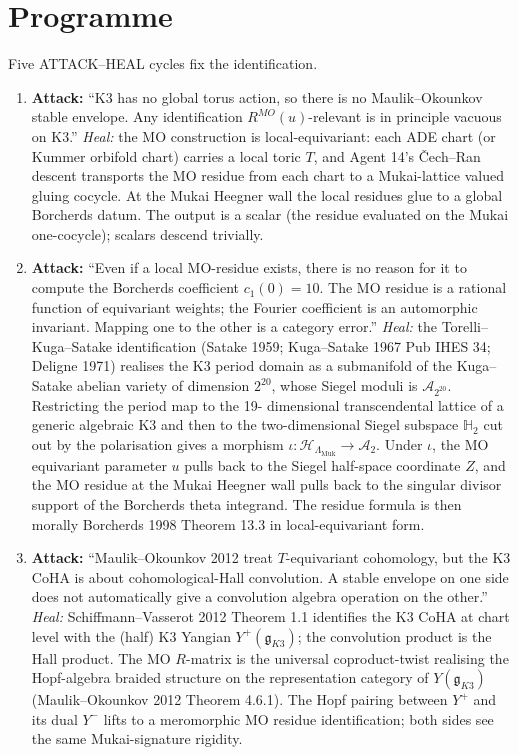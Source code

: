 \section*{Programme}

Five ATTACK--HEAL cycles fix the identification.

\begin{enumerate}
\item[(A1)]
   \textbf{Attack:} ``K3 has no global torus action, so there is no
   Maulik--Okounkov stable envelope.  Any identification
   $R^{MO}(u)$-relevant is in principle vacuous on K3.''
   \emph{Heal:} the MO construction is
   local-equivariant: each ADE chart (or Kummer orbifold chart)
   carries a local toric $T$, and Agent 14's \v Cech--Ran descent
   transports the MO residue from each chart to a Mukai-lattice
   valued gluing cocycle.  At the Mukai Heegner wall the local
   residues glue to a global Borcherds datum.  The output is a
   scalar (the residue evaluated on the Mukai one-cocycle); scalars
   descend trivially.

\item[(A2)]
   \textbf{Attack:} ``Even if a local MO-residue exists, there is no
   reason for it to compute the Borcherds coefficient $c_1(0) = 10$.
   The MO residue is a rational function of equivariant weights; the
   Fourier coefficient is an automorphic invariant.  Mapping one to
   the other is a category error.''
   \emph{Heal:} the Torelli--Kuga--Satake identification (Satake
   1959; Kuga--Satake 1967 Pub IHES 34; Deligne 1971) realises the
   K3 period domain as a submanifold of the Kuga--Satake abelian
   variety of dimension $2^{20}$, whose Siegel moduli is
   $\mathcal A_{2^{20}}$.  Restricting the period map to the 19-
   dimensional transcendental lattice of a generic algebraic K3 and
   then to the two-dimensional Siegel subspace $\mathbb H_{2}$ cut
   out by the polarisation gives a morphism $\iota\colon
   \mathcal H_{\Lambda_{\mathrm{Muk}}} \to \mathcal A_{2}$.  Under
   $\iota$, the MO equivariant parameter $u$ pulls back to the
   Siegel half-space coordinate $Z$, and the MO residue at the
   Mukai Heegner wall pulls back to the singular divisor support of
   the Borcherds theta integrand.  The residue formula is then
   morally Borcherds 1998 Theorem 13.3 in local-equivariant form.

\item[(A3)]
   \textbf{Attack:} ``Maulik--Okounkov 2012 treat
   $T$-equivariant cohomology, but the K3 CoHA is about
   cohomological-Hall convolution.  A stable envelope on one side
   does not automatically give a convolution algebra operation on
   the other.''
   \emph{Heal:} Schiffmann--Vasserot 2012 Theorem 1.1 identifies the
   K3 CoHA at chart level with the (half) K3 Yangian
   $Y^{+}(\mathfrak g_{K3})$; the convolution product is the Hall
   product.  The MO $R$-matrix is the universal coproduct-twist
   realising the Hopf-algebra braided structure on the
   representation category of $Y(\mathfrak g_{K3})$
   (Maulik--Okounkov 2012 Theorem 4.6.1).  The Hopf pairing between
   $Y^{+}$ and its dual $Y^{-}$ lifts to a meromorphic MO residue
   identification; both sides see the same Mukai-signature rigidity.


\end{enumerate}
